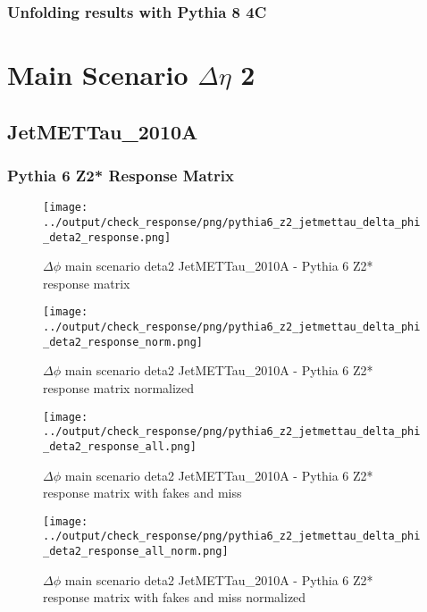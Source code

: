 \documentclass[11pt]{book}
\begin{document}
\clearpage
\subsection{Unfolding results with Pythia 8 4C}


\newpage
\chapter{Main Scenario $\Delta\eta$ 2 }
\section{JetMETTau\_2010A}
\subsection{Pythia 6 Z2* Response Matrix}

\begin{figure}[ht]
\centering
\texttt{[image: ../output/check\_response/png/pythia6\_z2\_jetmettau\_delta\_phi\_deta2\_response.png]}
\caption{$\Delta\phi$ main scenario deta2 JetMETTau\_2010A - Pythia 6 Z2* response matrix}
\label{p6_jetmettau_delta_phi_deta2_response}
\end{figure}

\begin{figure}[ht]
\centering
\texttt{[image: ../output/check\_response/png/pythia6\_z2\_jetmettau\_delta\_phi\_deta2\_response\_norm.png]}
\caption{$\Delta\phi$ main scenario deta2 JetMETTau\_2010A - Pythia 6 Z2* response matrix normalized}
\label{p6_jetmettau_delta_phi_deta2_response_norm}
\end{figure}

\begin{figure}[ht]
\centering
\texttt{[image: ../output/check\_response/png/pythia6\_z2\_jetmettau\_delta\_phi\_deta2\_response\_all.png]}
\caption{$\Delta\phi$ main scenario deta2 JetMETTau\_2010A - Pythia 6 Z2* response matrix with fakes and miss}
\label{p6_jetmettau_delta_phi_deta2_response_all}
\end{figure}

\begin{figure}[ht]
\centering
\texttt{[image: ../output/check\_response/png/pythia6\_z2\_jetmettau\_delta\_phi\_deta2\_response\_all\_norm.png]}
\caption{$\Delta\phi$ main scenario deta2 JetMETTau\_2010A - Pythia 6 Z2* response matrix with fakes and miss normalized}
\label{p6_jetmettau_delta_phi_deta2_response_all_norm}
\end{figure}
\end{document}
